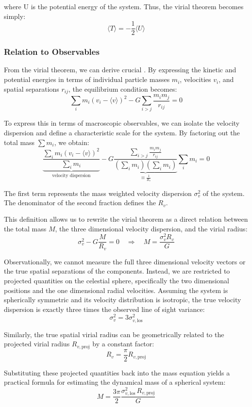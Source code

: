 where U is the potential energy of the system. Thus, the virial theorem becomes simply:
$$
\langle T \rangle = -\frac{1}{2} \langle U \rangle
$$

\subsubsection{Relation to Observables}

From the virial theorem, we can derive crucial . By expressing the kinetic and potential energies in terms of individual particle masses $m_i$, velocities $v_i$, and spatial separations $r_{ij}$, the equilibrium condition becomes:
$$
\sum_i m_i (v_i - \langle v \rangle)^2 - G \sum_{i > j} \frac{m_i m_j}{r_{ij}} = 0
$$

To express this in terms of macroscopic observables, we can isolate the velocity dispersion and define a characteristic scale for the system. By factoring out the total mass $\sum m_i$, we obtain:
$$
\underbrace{\frac{\sum_i m_i (v_i - \langle v \rangle)^2}{\sum_i m_i}}_{\text{velocity dispersion}} - G \underbrace{\frac{\sum_{i > j} \frac{m_i m_j}{r_{ij}}}{(\sum_i m_i)(\sum_i m_i)}}_{\equiv \frac{1}{R_v}} \sum_i m_i = 0
$$

The first term represents the mass weighted velocity dispersion $\sigma_v^2$ of the system. The denominator of the second fraction defines the  $R_v$. 

This definition allows us to rewrite the virial theorem as a direct relation between the total mass $M$, the three dimensional velocity dispersion, and the virial radius:
$$
\sigma_v^2 - G \frac{M}{R_v} = 0 \quad \Rightarrow \quad M = \frac{\sigma_v^2 R_v}{G}
$$

Observationally, we cannot measure the full three dimensional velocity vectors or the true spatial separations of the components. Instead, we are restricted to projected quantities on the celestial sphere, specifically the two dimensional positions and the one dimensional radial velocities. Assuming the system is spherically symmetric and its velocity distribution is isotropic, the true velocity dispersion is exactly three times the observed line of sight variance:
$$
\sigma_v^2 = 3 \sigma_{v,\mathrm{los}}^2
$$

Similarly, the true spatial virial radius can be geometrically related to the projected virial radius $R_{v,\mathrm{proj}}$ by a constant factor:
$$
R_v = \frac{\pi}{2} R_{v,\mathrm{proj}}
$$

Substituting these projected quantities back into the mass equation yields a practical formula for estimating the dynamical mass of a spherical system:
$$
M = \frac{3\pi}{2} \frac{\sigma_{v,\mathrm{los}}^2 \, R_{v,\mathrm{proj}}}{G}
$$

